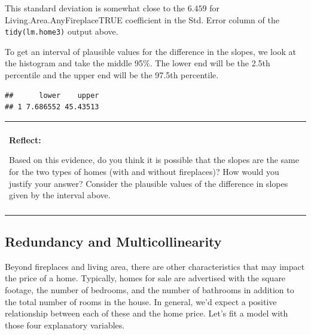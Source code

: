 \documentclass[
]{book}
\newenvironment{Shaded}{\begin{snugshade}}{\end{snugshade}}
\newcommand{\DataTypeTok}[1]{\textcolor[rgb]{0.13,0.29,0.53}{#1}}
\newcommand{\FloatTok}[1]{\textcolor[rgb]{0.00,0.00,0.81}{#1}}
\newcommand{\KeywordTok}[1]{\textcolor[rgb]{0.13,0.29,0.53}{\textbf{#1}}}
\newcommand{\NormalTok}[1]{#1}
\newcommand{\OperatorTok}[1]{\textcolor[rgb]{0.81,0.36,0.00}{\textbf{#1}}}
\newcommand{\StringTok}[1]{\textcolor[rgb]{0.31,0.60,0.02}{#1}}
\newenvironment{reflect}
{
    \begin{center}
    
    \begin{tabular}{|p{0.8\textwidth}|}
    \rowcolor{LightBlue}
    \hline\\
    \rowcolor{LightBlue}
    \textbf{Reflect:}
}
{
    \\\rowcolor{LightBlue}
    \\\hline
    \end{tabular} 
    \end{center}
}
\begin{document}
This standard deviation is somewhat close to the \(6.459\) for Living.Area.AnyFireplaceTRUE coefficient in the Std. Error column of the \texttt{tidy(lm.home3)} output above.

To get an interval of plausible values for the difference in the slopes, we look at the histogram and take the middle 95\%. The lower end will be the 2.5th percentile and the upper end will be the 97.5th percentile.

\begin{Shaded}
\end{Shaded}

\begin{verbatim}
##      lower    upper
## 1 7.686552 45.43513
\end{verbatim}

\begin{reflect}
Based on this evidence, do you think it is possible that the slopes are
the same for the two types of homes (with and without fireplaces)? How
would you justify your answer? Consider the plausible values of the
difference in slopes given by the interval above.
\end{reflect}

\hypertarget{redundant}{%
\subsection{Redundancy and Multicollinearity}\label{redundant}}

Beyond fireplaces and living area, there are other characteristics that may impact the price of a home. Typically, homes for sale are advertised with the square footage, the number of bedrooms, and the number of bathrooms in addition to the total number of rooms in the house. In general, we'd expect a positive relationship between each of these and the home price. Let's fit a model with those four explanatory variables.

\begin{Shaded}
\end{Shaded}
\end{document}
